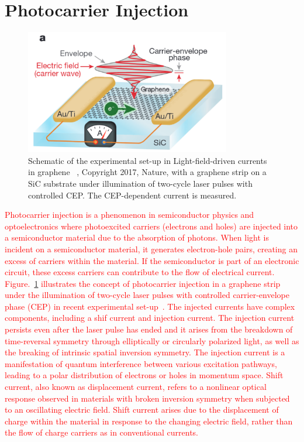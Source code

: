 \section{Photocarrier Injection \label{sec:intro_photocarrier}}
\begin{figure}[htpb]
	\centering
	\includegraphics[width=0.8\textwidth]{pic/photocarrier_intro.pdf}
	\caption[Lab coordinate system]{Schematic of the experimental set-up in Light-field-driven currents in graphene ~\cite{Higuchi2017}, Copyright 2017, Nature, with a graphene strip on a SiC substrate under illumination of two-cycle laser pulses with controlled CEP. The CEP-dependent current is measured.}
	\label{fig: photocarrier_intro}
\end{figure}
\textcolor{red}{Photocarrier injection is a phenomenon in semiconductor physics and optoelectronics where photoexcited carriers (electrons and holes) are injected into a semiconductor material due to the absorption of photons.  When light is incident on a semiconductor material, it generates electron-hole pairs, creating an excess of carriers within the material. If the semiconductor is part of an electronic circuit, these excess carriers can contribute to the flow of electrical current. Figure.~\ref{fig: photocarrier_intro} illustrates the concept of photocarrier injection in a graphene strip under the illumination of two-cycle laser pulses with controlled carrier-envelope phase (CEP) in recent experimental set-up~\cite{Higuchi2017}. The injected currents have complex components, including a shif current  and injection current. The injection current persists even after the laser pulse has ended and it arises from the breakdown of time-reversal symmetry through elliptically or circularly polarized light, as well as the breaking of intrinsic spatial inversion symmetry. The injection current is a manifestation of quantum interference between various excitation pathways, leading to a polar distribution of electrons or holes in momentum space. Shift current, also known as displacement current, refers to a nonlinear optical response observed in materials with broken inversion symmetry when subjected to an oscillating electric field. Shift current arises due to the displacement of charge within the material in response to the changing electric field, rather than the flow of charge carriers as in conventional currents.}

